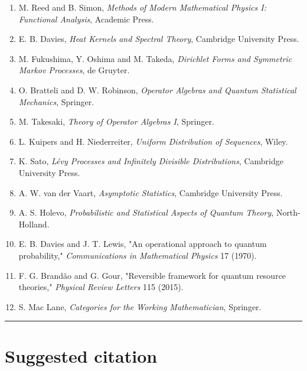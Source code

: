 \documentclass[11pt,a4paper,openany]{report}
\begin{document}
\begin{enumerate}
\item 
M. Reed and B. Simon, \emph{Methods of Modern Mathematical Physics I: Functional Analysis}, Academic Press.

\item 
E. B. Davies, \emph{Heat Kernels and Spectral Theory}, Cambridge University Press.

\item 
M. Fukushima, Y. Oshima and M. Takeda, \emph{Dirichlet Forms and Symmetric Markov Processes}, de Gruyter.

\item 
O. Bratteli and D. W. Robinson, \emph{Operator Algebras and Quantum Statistical Mechanics}, Springer.

\item 
M. Takesaki, \emph{Theory of Operator Algebras I}, Springer.

\item 
L. Kuipers and H. Niederreiter, \emph{Uniform Distribution of Sequences}, Wiley.

\item 
K. Sato, \emph{Lévy Processes and Infinitely Divisible Distributions}, Cambridge University Press.

\item 
A. W. van der Vaart, \emph{Asymptotic Statistics}, Cambridge University Press.

\item 
A. S. Holevo, \emph{Probabilistic and Statistical Aspects of Quantum Theory}, North-Holland.

\item 
E. B. Davies and J. T. Lewis, "An operational approach to quantum probability," \emph{Communications in Mathematical Physics} 17 (1970).

\item 
F. G. Brandão and G. Gour, "Reversible framework for quantum resource theories," \emph{Physical Review Letters} 115 (2015).

\item 
S. Mac Lane, \emph{Categories for the Working Mathematician}, Springer.

\end{enumerate}

\par\medskip\hrule\medskip

\chapter{Suggested citation}
\end{document}
